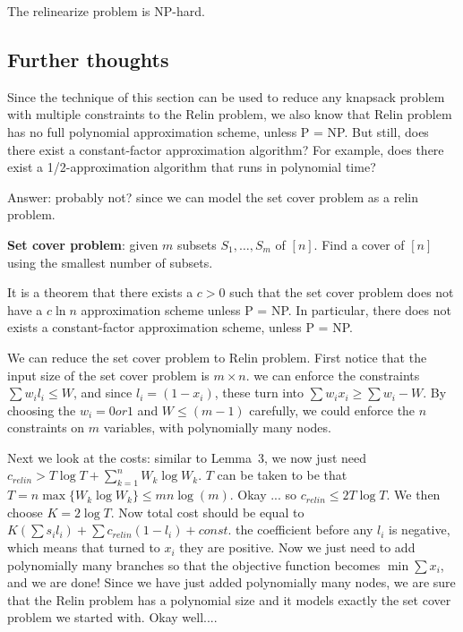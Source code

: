 \documentclass[11pt]{article} %
\theoremstyle{plain}
\theoremstyle{definition}
\begin{document}
\begin{corollary}
The relinearize problem is NP-hard. 
\end{corollary}


\iffalse
\subsection{Further thoughts}
Since the technique of this section can be used to reduce any knapsack problem with multiple constraints
to the Relin problem, we also know that Relin problem has no full polynomial approximation scheme, unless P = NP. But still, does there exist a constant-factor approximation algorithm? For example, does there exist a 1/2-approximation algorithm that runs in polynomial time? 


Answer: probably not? since we can model the set cover problem as a relin problem. 


{\bf Set cover problem}: given $m$ subsets $S_1, \ldots , S_m$  of $[n]$. Find a cover of $[n]$ using the smallest number of subsets. 

It is a theorem that there exists a $c > 0$ such that the set cover problem does not have a $c\ln n$ approximation scheme unless P = NP. In particular, there does not exists a constant-factor approximation scheme, unless P = NP. 

We can reduce the set cover problem to Relin problem. First notice that the input size of the set cover 
problem is $m \times n$. we can enforce the constraints $\sum w_i l_i \leq W$, and since $l_i = (1-x_i)$, 
these turn into $\sum w_i x_i \geq \sum w_i - W$. By choosing the $w_i = 0 or 1$ and $W \leq (m-1)$ carefully, we could enforce the $n$ constraints on $m$ variables, with polynomially many nodes. 

Next we look at the costs: similar to Lemma~3, we now just need $c_{relin} > T\log T + \sum_{k=1}^{n} W_k \log W_k$.  $T$ can be taken to be that $T = n \max \{W_k \log W_k \} \leq mn \log(m)$.   Okay ... so $c_{relin} \leq 2T \log T$. We then choose $K = 2\log T$.  Now total cost should be equal to 
$K(\sum s_i l_i) + \sum c_{relin}(1-l_i) + const$. the coefficient before any $l_i$ is negative, which means that turned to $x_i$ they are positive. Now we just need to add polynomially many branches so that the objective function becomes  $\min \sum x_i$, and we are done! Since we have just added polynomially many nodes, we are sure that the Relin problem has a polynomial size and it models exactly the set cover problem we started with. Okay well....
\end{document}
